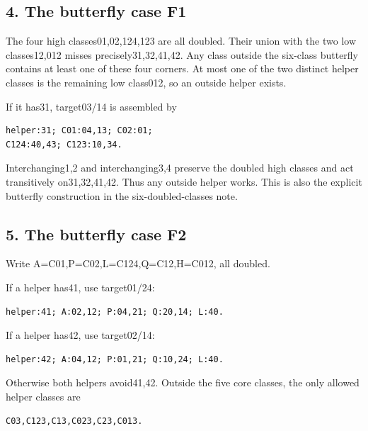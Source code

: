 \documentclass[
  10pt,
]{article}
\begin{document}
\hypertarget{the-butterfly-case-f1}{%
\subsection*{4. The butterfly case F1}\label{the-butterfly-case-f1}}

The four high classes01,02,124,123 are all doubled. Their union with the
two low classes12,012 misses precisely31,32,41,42. Any class outside the
six-class butterfly contains at least one of these four corners. At most
one of the two distinct helper classes is the remaining low class012, so
an outside helper exists.

If it has31, target03/14 is assembled by

\begin{verbatim}
helper:31; C01:04,13; C02:01;
C124:40,43; C123:10,34.
\end{verbatim}

Interchanging1,2 and interchanging3,4 preserve the doubled high classes
and act transitively on31,32,41,42. Thus any outside helper works. This
is also the explicit butterfly construction in the six-doubled-classes
note.

\hypertarget{the-butterfly-case-f2}{%
\subsection*{5. The butterfly case F2}\label{the-butterfly-case-f2}}

Write A=C01,P=C02,L=C124,Q=C12,H=C012, all doubled.

If a helper has41, use target01/24:

\begin{verbatim}
helper:41; A:02,12; P:04,21; Q:20,14; L:40.
\end{verbatim}

If a helper has42, use target02/14:

\begin{verbatim}
helper:42; A:04,12; P:01,21; Q:10,24; L:40.
\end{verbatim}

Otherwise both helpers avoid41,42. Outside the five core classes, the
only allowed helper classes are

\begin{verbatim}
C03,C123,C13,C023,C23,C013.
\end{verbatim}
\end{document}
